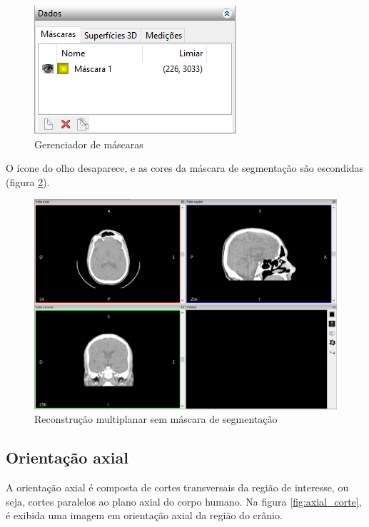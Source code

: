 \begin{figure}[!htb]
\centering
\includegraphics[scale=0.8]{../user_guide_figures/invesalius_screen/data_mask_pt.png}
\caption{Gerenciador de máscaras}
\label{fig:ger_masc}
\end{figure}

O ícone do olho desaparece, e as cores da máscara de segmentação são escondidas (figura
\ref{fig:mpr_sem_mask}).

\begin{figure}[!htb]
\centering
\includegraphics[scale=0.30]{../user_guide_figures/invesalius_screen/multiplanar_window_pt.png}
\caption{Reconstrução multiplanar sem máscara de segmentação}
\label{fig:mpr_sem_mask}
\end{figure}

\subsection{Orientação axial}

A orientação axial é composta de cortes transversais da região
de interesse, ou seja, cortes paralelos ao plano axial do corpo humano.
Na figura \ref{fig:axial_corte}, é exibida uma imagem em orientação axial da
região do crânio.


